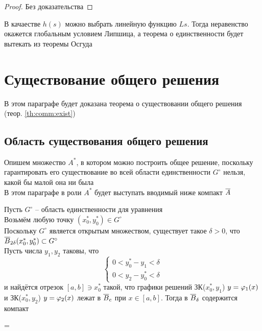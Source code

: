 \begin{proof}
	Без доказательства
\end{proof}

\begin{remark}
    В качаестве $ h(s) $ можно выбрать линейную функцию $ Ls $. Тогда неравенство  окажется глобальным условием Липшица, а теорема о единственности будет вытекать из теоремы Осгуда
\end{remark}

\section{Существование общего решения}

В этом параграфе будет доказана теорема о существовании общего решения (теор. \ref{th:comm:exist})

\subsection{Область существования общего решения}

Опишем множество $ A^* $, в котором можно построить общее решение, поскольку гарантировать его существование во всей области единственности $ G^\circ $ нельзя, какой бы малой она ни была \\
В этом параграфе в роли $ A^* $ будет выступать вводимый ниже компакт $ \ol{A} $

\begin{algorithm}[построения $ \ol{A} $]
    Пусть $ G^\circ $ -- область единственности для уравнения  \\
    Возьмём любую точку $ (x_0^*, y_0^*) \in G^\circ $ \\
    Поскольку $ G^\circ $ является открытым множеством, существует такое $ \delta > 0 $, что $ \overline{B}_{2\delta}(x_0^*, y_0^*) \subset G^\circ $ \\
    Пусть числа $ y_1, y_2 $ таковы, что
    $$
    \begin{cases}
    	0 < y_0^* - y_1 < \delta \\
        0 < y_2 - y_0^* < \delta
    \end{cases} $$
    и найдётся отрезок $ [a, b] \ni x_0^* $ такой, что графики решений ЗК($ x_0^*, y_1 $) $ y = \varphi_1(x) $ и ЗК($ x_0^*, y_2 $) $ y = \varphi_2(x) $ лежат в $ \overline{B}_c $ при $ x \in [a, b] $. Тогда в $ \overline{B}_\delta $ содержится компакт
    \begin{equ}{1.25}
         = 
    \end{equ}
\end{algorithm}

